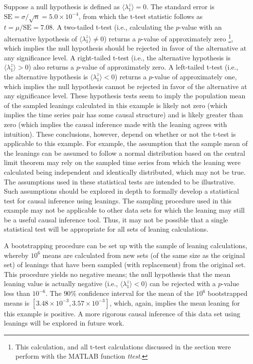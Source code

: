 \documentclass[a4paper,11pt]{article}
\begin{document}
Suppose a null hypothesis is defined as $\langle\lambda_1^z\rangle = 0$.  The standard error is $\mathrm{SE}=\sigma/\sqrt{n}= 5.0\times 10^{-4}$, from which the t-test statistic follows \cite{Casella2002} as $t=\mu/\mathrm{SE}=7.08$.  A two-tailed t-test (i.e., calculating the $p$-value with an alternative hypothesis of $\langle\lambda_1^z\rangle \neq 0$) returns a $p$-value of approximately zero \footnote{This calculation, and all t-test calculations discussed in the section were perform with the {\sc MATLAB} function {\em ttest}.}, which implies the null hypothesis should be rejected in favor of the alternative at any significance level.  A right-tailed t-test (i.e., the alternative hypothesis is $\langle\lambda_1^z\rangle > 0$) also returns a $p$-value of approximately zero.  A left-tailed t-test (i.e., the alternative hypothesis is $\langle\lambda_1^z\rangle < 0$) returns a $p$-value of approximately one, which implies the null hypothesis cannot be rejected in favor of the alternative at any significance level.  These hypothesis tests seem to imply the population mean of the sampled leanings calculated in this example is likely not zero (which implies the time series pair has some causal structure) and is likely greater than zero (which implies the causal inference made with the leaning agrees with intuition).  These conclusions, however, depend on whether or not the t-test is applicable to this example.  For example, the assumption that the sample mean of the leanings can be assumed to follow a normal distribution based on the central limit theorem \cite{Casella2002} may rely on the sampled time series from which the leaning were calculated being independent and identically distributed, which may not be true.  The assumptions used in these statistical tests are intended to be illustrative.  Such assumptions should be explored in depth to formally develop a statistical test for causal inference using leanings.  The sampling procedure used in this example may not be applicable to other data sets for which the leaning may still be a useful causal inference tool.  Thus, it may not be possible that a single statistical test will be appropriate for all sets of leaning calculations.    

A bootstrapping \cite{Efron1994} procedure can be set up with the sample of leaning calculations, whereby $10^6$ means are calculated from new sets (of the same size as the original set) of leanings that have been sampled (with replacement) from the original set.  This procedure yields no negative means; the null hypothesis that the mean leaning value is actually negative (i.e., $\langle\lambda_1^z\rangle < 0$) can be rejected with a $p$-value less than $10^{-6}$.  The $90\%$ confidence interval for the mean of the $10^6$ bootstrapped means is $[3.48\times 10^{-3},3.57\times 10^{-3}]$, which, again, implies the mean leaning for this example is positive.  A more rigorous causal inference of this data set using leanings will be explored in future work.   



\end{document}
